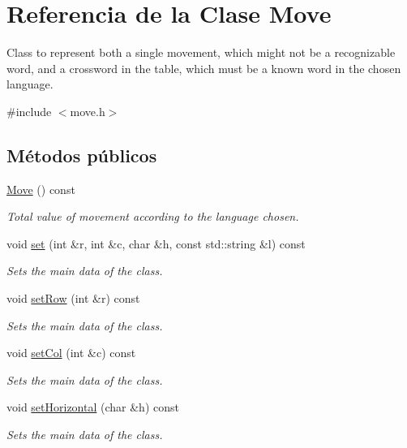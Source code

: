 \hypertarget{classMove}{}\section{Referencia de la Clase Move}
\label{classMove}


Class to represent both a single movement, which might not be a recognizable word, and a crossword in the table, which must be a known word in the chosen language.  




{\ttfamily \#include $<$move.\+h$>$}

\subsection*{Métodos públicos}
\begin{DoxyCompactItemize}
\item 
\hyperlink{classMove_aa10d03bba58735a16266b377c0a1a08a}{Move} () const
\begin{DoxyCompactList}\small\item\em Total value of movement according to the language chosen. \end{DoxyCompactList}\item 
void \hyperlink{classMove_a87897c0e51c71b1e81a730e66a262de8}{set} (int \&r, int \&c, char \&h, const std\+::string \&l) const
\begin{DoxyCompactList}\small\item\em Sets the main data of the class. \end{DoxyCompactList}\item 
void \hyperlink{classMove_a7389abf2c4bca5ac05b374c91aba67ac}{set\+Row} (int \&r) const
\begin{DoxyCompactList}\small\item\em Sets the main data of the class. \end{DoxyCompactList}\item 
void \hyperlink{classMove_a89cca01dd000395f5457af183f95cfac}{set\+Col} (int \&c) const
\begin{DoxyCompactList}\small\item\em Sets the main data of the class. \end{DoxyCompactList}\item 
void \hyperlink{classMove_a9bbcfaffef5c4c0ca0ca8ffda928f1c1}{set\+Horizontal} (char \&h) const
\begin{DoxyCompactList}\small\item\em Sets the main data of the class. \end{DoxyCompactList}\item 

\end{DoxyCompactItemize}
